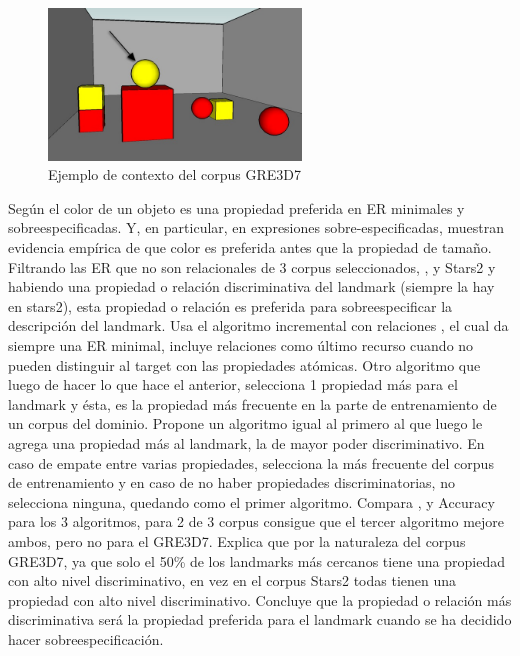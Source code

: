 

\begin{figure}[ht]
\centering
\includegraphics[width=0.6\textwidth]{images/7.jpg}
\caption{Ejemplo de contexto del corpus GRE3D7}
\label{GRE3D7-stimulus7}
\end{figure}

Seg\'un \cite{pechmann} el color de un objeto es una propiedad preferida en ER minimales y sobreespecificadas. Y, en particular, en expresiones sobre-especificadas, \cite{time-course} muestran evidencia emp\'irica de que color es preferida antes que la propiedad de tama\~no.
Filtrando las ER que no son relacionales de 3 corpus seleccionados, \cite{gre3d3}, \cite{gre3d7} y Stars2 y habiendo una propiedad o relaci\'on discriminativa del landmark (siempre la hay en stars2), esta propiedad o relaci\'on es preferida para sobreespecificar la descripci\'on del landmark.
Usa el algoritmo incremental con relaciones \cite{incremental}, el cual da siempre una ER minimal, incluye relaciones como \'ultimo recurso cuando no pueden distinguir al target con las propiedades at\'omicas. Otro algoritmo que luego de hacer lo que hace el anterior, selecciona 1 propiedad m\'as para el landmark y \'esta, es la propiedad m\'as frecuente en la parte de entrenamiento de un corpus del dominio. Propone un algoritmo igual al primero al que luego le agrega una propiedad m\'as al landmark, la de mayor poder discriminativo. En caso de empate entre varias propiedades, selecciona la m\'as frecuente del corpus de entrenamiento y en caso de no haber propiedades discriminatorias, no selecciona ninguna, quedando como el primer algoritmo. Compara \cite{dice}, y Accuracy para los 3 algoritmos, para 2 de 3 corpus consigue que el tercer algoritmo mejore ambos, pero no para el GRE3D7. 
Explica que por la naturaleza del corpus GRE3D7, ya que solo el 50\% de los landmarks m\'as cercanos tiene una propiedad con alto nivel discriminativo, en vez en el corpus Stars2 todas tienen una propiedad con alto nivel discriminativo. Concluye que la propiedad o relaci\'on m\'as discriminativa ser\'a la propiedad preferida para el landmark cuando se ha decidido hacer sobreespecificaci\'on.

